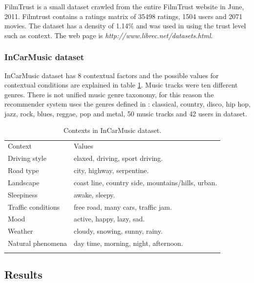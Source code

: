 FilmTrust is a small dataset crawled from the entire FilmTrust website
in June, 2011. Filmtrust contains a ratings matrix of 35498 ratings,
1504  users and 2071 movies. The dataset has a density of 1.14\% and
was used in \cite{guo2013novel} using the trust level such as
context. The web page is \textit{http://www.librec.net/datasets.html}.

\subsubsection{InCarMusic dataset}

InCarMusic dataset\cite{baltrunas2011incarmusic} has 8 
contextual factors and the possible values for contextual conditions 
are explained in table \ref{tab:incarmusic}.
Music tracks were ten different genres. There is not unified music
genre taxonomy, for this reason the recommender system uses the genres
defined in \cite{tzanetakis2002musical}: classical, country, disco, 
hip hop,  jazz, rock, blues, reggae, pop and metal, 50 music tracks 
and 42 users in dataset.
\begin{table}
	\centering
	\small
	\caption{Contexts in InCarMusic dataset.}
	\label{tab:incarmusic}   
	\begin{tabular}{ll}
		\hline\noalign{\smallskip}
		Context  			& Values \\
		\noalign{\smallskip}\hline\noalign{\smallskip}
		Driving style 		&  elaxed, driving, sport driving.   \\
		Road type 			&  city, highway, serpentine. \\
		Landscape 			& coast line, country side, mountains/hills, urban.\\
		Sleepiness 			& awake, sleepy. \\
		Traffic conditions 	& free road, many cars, traffic jam. \\
		Mood 				& active, happy, lazy, sad. \\
		Weather 			& cloudy, snowing, sunny, rainy. \\
		Natural phenomena 	& day time, morning, night, afternoon. \\
		\noalign{\smallskip}\hline
	\end{tabular}
\end{table}

\subsection{Results} 

